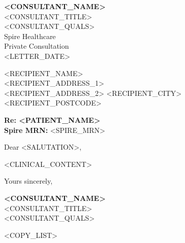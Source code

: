 \documentclass[a4paper,11pt]{article}
\begin{document}
\begin{flushright}
    \textbf{<CONSULTANT_NAME>}\\
    <CONSULTANT_TITLE>\\
    <CONSULTANT_QUALS>\\
    \vspace{3mm}
    Spire Healthcare\\
    Private Consultation\\
    \vspace{3mm}
    <LETTER_DATE>
\end{flushright}

\vspace{10mm}

\noindent
\vspace*{35mm} %
\begin{flushleft}
<RECIPIENT_NAME>\\
<RECIPIENT_ADDRESS_1>\\
<RECIPIENT_ADDRESS_2>
<RECIPIENT_CITY>\\
<RECIPIENT_POSTCODE>
\end{flushleft}

\vspace{15mm}

\noindent
\textbf{Re: <PATIENT_NAME>}\\
\textbf{Spire MRN:} <SPIRE_MRN>\\

\vspace{10mm}

\noindent
Dear <SALUTATION>,

\vspace{5mm}

\noindent
<CLINICAL_CONTENT>

\vspace{10mm}

\noindent
Yours sincerely,

\vspace{15mm}

\noindent
\textbf{<CONSULTANT_NAME>}\\
<CONSULTANT_TITLE>\\
<CONSULTANT_QUALS>

\vspace{10mm}

<COPY_LIST>
\end{document}
